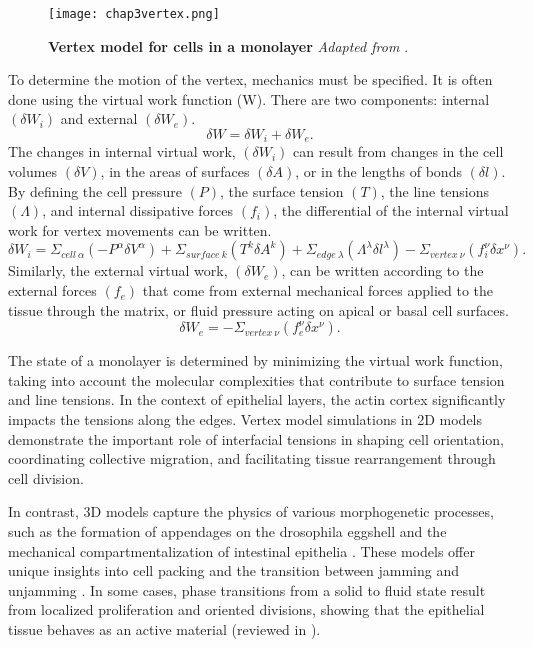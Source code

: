 \begin{wrapfigure}{r}{5.5cm}
	\caption{\textbf{Vertex model for cells in a monolayer} \textit{Adapted from \cite{gomez-gonzalez2020}}.}\label{fig_3_7}
	\texttt{[image: chap3vertex.png]}
\end{wrapfigure} 

To determine the motion of the vertex, mechanics must be specified. It is often done using the virtual work function (W). There are two components: internal $(\delta W_i)$ and external $(\delta W_e)$. 
$$ \delta W = \delta W_i + \delta W_e .$$ 
The changes in internal virtual work,  $(\delta W_i)$ can result from changes in the cell volumes $(\delta V)$, in the areas of surfaces $(\delta A)$, or in the lengths of bonds $(\delta l)$. By defining the cell pressure $(P)$, the surface tension $(T)$, the line tensions $(\Lambda)$, and internal dissipative forces $(f_i)$, the differential of the internal virtual work for vertex movements can be written. 
$$ \delta W_i = \Sigma_{cell\ \alpha} \left( -P^\alpha \delta V^\alpha \right) + \Sigma_{surface\ k} \left( T^k \delta A^k \right) + \Sigma_{edge\ \lambda} \left( \Lambda^\lambda \delta l^\lambda \right) - \Sigma_{vertex\ \nu} \left( f_i^\nu \delta x^\nu \right). $$
Similarly, the external virtual work, $(\delta W_e)$, can be written according to the external forces $(f_e)$ that come from external mechanical forces applied to the tissue through the matrix, or fluid pressure acting on apical or basal cell surfaces.
$$ \delta W_e =  - \Sigma_{vertex\ \nu} \left( f_e^\nu \delta x^\nu \right). $$

The state of a monolayer is determined by minimizing the virtual work function, taking into account the molecular complexities that contribute to surface tension and line tensions. In the context of epithelial layers, the actin cortex significantly impacts the tensions along the edges. Vertex model simulations in 2D models demonstrate the important role of interfacial tensions in shaping cell orientation, coordinating collective migration, and facilitating tissue rearrangement through cell division.

In contrast, 3D models capture the physics of various morphogenetic processes, such as the formation of appendages on the drosophila eggshell and the mechanical compartmentalization of intestinal epithelia \cite{osterfield2017, perez-gonzalez2021}. These models offer unique insights into cell packing and the transition between jamming and unjamming \cite{park2015, tang2022}. In some cases, phase transitions from a solid to fluid state result from localized proliferation and oriented divisions, showing that the epithelial tissue behaves as an active material (reviewed in \cite{lenne2022}).


